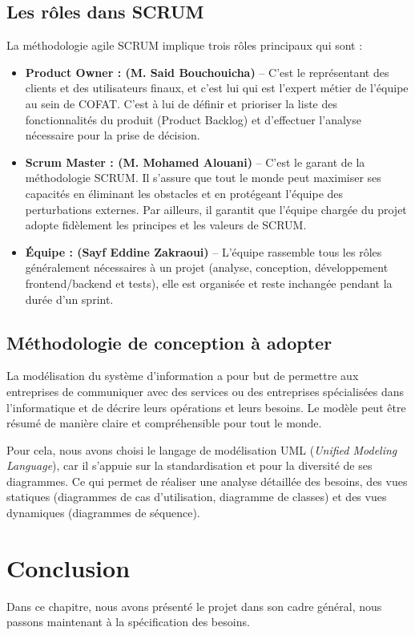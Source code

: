 \subsection{Les rôles dans SCRUM}
La méthodologie agile SCRUM implique trois rôles principaux qui sont :
\begin{itemize}
    \item \textbf{Product Owner : (M. Said Bouchouicha)} -- C'est le représentant des clients et des utilisateurs finaux, et c'est lui qui est l'expert métier de l'équipe au sein de COFAT. C'est à lui de définir et prioriser la liste des fonctionnalités du produit (Product Backlog) et d'effectuer l'analyse nécessaire pour la prise de décision.
    \item \textbf{Scrum Master : (M. Mohamed Alouani)} -- C'est le garant de la méthodologie SCRUM. Il s'assure que tout le monde peut maximiser ses capacités en éliminant les obstacles et en protégeant l'équipe des perturbations externes. Par ailleurs, il garantit que l'équipe chargée du projet adopte fidèlement les principes et les valeurs de SCRUM.
    \item \textbf{Équipe : (Sayf Eddine Zakraoui)} -- L'équipe rassemble tous les rôles généralement nécessaires à un projet (analyse, conception, développement frontend/backend et tests), elle est organisée et reste inchangée pendant la durée d'un sprint.
\end{itemize}

\subsection{Méthodologie de conception à adopter}
La modélisation du système d'information a pour but de permettre aux entreprises de communiquer avec des services ou des entreprises spécialisées dans l'informatique et de décrire leurs opérations et leurs besoins. Le modèle peut être résumé de manière claire et compréhensible pour tout le monde.

Pour cela, nous avons choisi le langage de modélisation UML (\textit{Unified Modeling Language}), car il s'appuie sur la standardisation et pour la diversité de ses diagrammes. Ce qui permet de réaliser une analyse détaillée des besoins, des vues statiques (diagrammes de cas d'utilisation, diagramme de classes) et des vues dynamiques (diagrammes de séquence).

\section*{Conclusion}
Dans ce chapitre, nous avons présenté le projet dans son cadre général, nous passons maintenant à la spécification des besoins.
